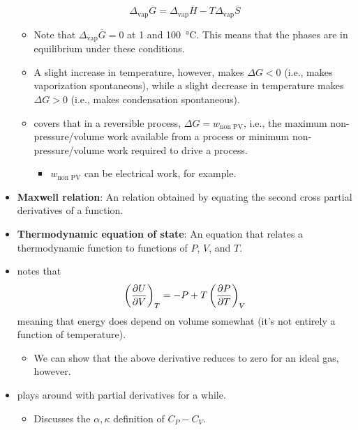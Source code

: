 \documentclass[../notes.tex]{subfiles}
\begin{document}
\begin{itemize}
\begin{equation*}
        \Delta_\text{vap}\overline{G} = \Delta_\text{vap}\overline{H}-T\Delta_\text{vap}\overline{S}
    \end{equation*}
    \begin{itemize}
        \item Note that $\Delta_\text{vap}\overline{G}=0$ at \SI{1}{\atmosphere} and \SI{100}{\celsius}. This means that the phases are in equilibrium under these conditions.
        \item A slight increase in temperature, however, makes $\Delta G<0$ (i.e., makes vaporization spontaneous), while a slight decrease in temperature makes $\Delta G>0$ (i.e., makes condensation spontaneous).
        \item \textcite{bib:McQuarrieSimon} covers that in a reversible process, $\Delta G=w_\text{non PV}$, i.e., the maximum non-pressure/volume work available from a process or minimum non-pressure/volume work required to drive a process.
        \begin{itemize}
            \item $w_\text{non PV}$ can be electrical work, for example.
        \end{itemize}
    \end{itemize}
    \item \textbf{Maxwell relation}: An relation obtained by equating the second cross partial derivatives of a function.
    \item \textbf{Thermodynamic equation of state}: An equation that relates a thermodynamic function to functions of $P$, $V$, and $T$.
    \item \textcite{bib:McQuarrieSimon} notes that
    \begin{equation*}
        \left( \pdv{U}{V} \right)_T = -P+T\left( \pdv{P}{T} \right)_V
    \end{equation*}
    meaning that energy does depend on volume somewhat (it's not entirely a function of temperature).
    \begin{itemize}
        \item We can show that the above derivative reduces to zero for an ideal gas, however.
    \end{itemize}
    \item \textcite{bib:McQuarrieSimon} plays around with partial derivatives for a while.
    \begin{itemize}
        \item Discusses the $\alpha,\kappa$ definition of $C_P-C_V$.
    \end{itemize}

\end{itemize}
\end{document}
